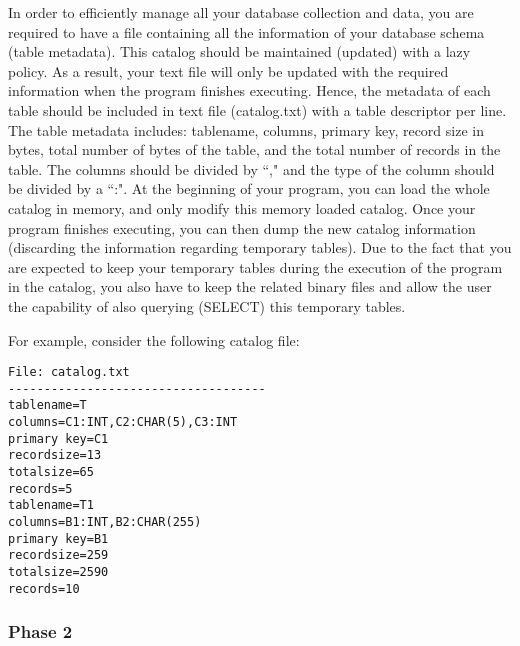 In order to efficiently manage all your database collection and data, you
are required to have a file containing all the information of your database schema (table metadata).
This catalog should be maintained (updated) with a lazy policy. As a result, your
text file will only be updated with the required information
when the program finishes executing.
Hence, the metadata of each table should
be included in text file (catalog.txt) with a 
table descriptor per line.
The table metadata includes:
tablename, columns, primary key, record size in bytes,
total number of bytes of the table,
and the total number of records in the table.
The columns should be divided by ``," and
the type of the column should be divided by a ``:".
At the beginning of your program, you can load
the whole catalog in memory, and only modify this
memory loaded catalog. Once your program finishes executing, you
can then dump the new catalog information 
(discarding the information regarding temporary tables).
Due to the fact that you are expected to keep your temporary tables during the execution
of the program in the catalog, you also have to keep the related binary files and
allow the user the capability of also querying (SELECT) this temporary tables.

For example, consider the following catalog file:

\begin{verbatim}
File: catalog.txt 
------------------------------------
tablename=T
columns=C1:INT,C2:CHAR(5),C3:INT
primary key=C1
recordsize=13
totalsize=65
records=5
tablename=T1
columns=B1:INT,B2:CHAR(255)
primary key=B1
recordsize=259
totalsize=2590
records=10
\end{verbatim}

\subsubsection{Phase 2}

